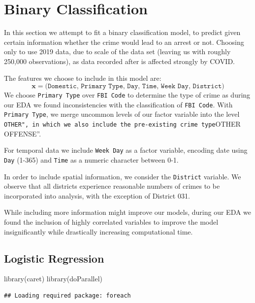\documentclass[
]{article}
\newenvironment{Shaded}{\begin{snugshade}}{\end{snugshade}}
\newcommand{\FunctionTok}[1]{\textcolor[rgb]{0.00,0.00,0.00}{#1}}
\newcommand{\NormalTok}[1]{#1}
\begin{document}
\section{Binary Classification}

In this section we attempt to fit a binary classification model, to
predict given certain information whether the crime would lead to an
arrest or not. Choosing only to use 2019 data, due to scale of the data
set (leaving us with roughly 250,000 observations), as data recorded
after is affected strongly by COVID.

The features we choose to include in this model are:
\[\mathbf{x} = \texttt{(Domestic, Primary Type, Day, Time, Week Day, District})\]
We choose \texttt{Primary Type} over \texttt{FBI Code} to determine the
type of crime as during our EDA we found inconsistencies with the
classification of \texttt{FBI Code}. With \texttt{Primary Type}, we
merge uncommon levels of our factor variable into the level
\texttt{OTHER",\ in\ which\ we\ also\ include\ the\ pre-existing\ crime\ type}OTHER
OFFENSE''.

For temporal data we include \texttt{Week Day} as a factor variable,
encoding date using \texttt{Day} (1-365) and \texttt{Time} as a numeric
character between 0-1.

In order to include spatial information, we consider the
\texttt{District} variable. We observe that all districts experience
reasonable numbers of crimes to be incorporated into analysis, with the
exception of District 031.

While including more information might improve our models, during our
EDA we found the inclusion of highly correlated variables to improve the
model insignificantly while drastically increasing computational time.

\subsection{Logistic Regression}

\begin{Shaded}
\begin{Highlighting}[]
\FunctionTok{library}\NormalTok{(caret)}
\FunctionTok{library}\NormalTok{(doParallel)}
\end{Highlighting}
\end{Shaded}

\begin{verbatim}
## Loading required package: foreach
\end{verbatim}
\end{document}
